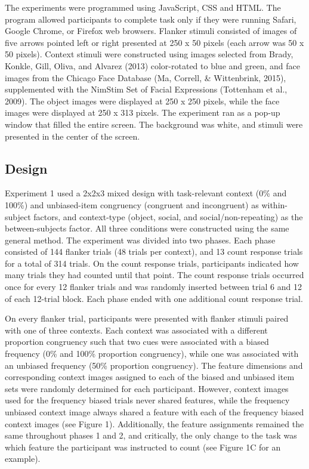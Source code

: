 \documentclass[english,,man,floatsintext]{apa6}
\begin{document}
The experiments were programmed using JavaScript, CSS and HTML. The program allowed participants to complete task only if they were running Safari, Google Chrome, or Firefox web browsers. Flanker stimuli consisted of images of five arrows pointed left or right presented at 250 x 50 pixels (each arrow was 50 x 50 pixels). Context stimuli were constructed using images selected from Brady, Konkle, Gill, Oliva, and Alvarez (2013) color-rotated to blue and green, and face images from the Chicago Face Database (Ma, Correll, \& Wittenbrink, 2015), supplemented with the NimStim Set of Facial Expressions (Tottenham et al., 2009). The object images were displayed at 250 x 250 pixels, while the face images were displayed at 250 x 313 pixels. The experiment ran as a pop-up window that filled the entire screen. The background was white, and stimuli were presented in the center of the screen.

\hypertarget{design}{%
\subsection{Design}\label{design}}

Experiment 1 used a 2x2x3 mixed design with task-relevant context (0\% and 100\%) and unbiased-item congruency (congruent and incongruent) as within-subject factors, and context-type (object, social, and social/non-repeating) as the between-subjects factor.
All three conditions were constructed using the same general method. The experiment was divided into two phases. Each phase consisted of 144 flanker trials (48 trials per context), and 13 count response trials for a total of 314 trials. On the count response trials, participants indicated how many trials they had counted until that point. The count response trials occurred once for every 12 flanker trials and was randomly inserted between trial 6 and 12 of each 12-trial block. Each phase ended with one additional count response trial.

On every flanker trial, participants were presented with flanker stimuli paired with one of three contexts. Each context was associated with a different proportion congruency such that two cues were associated with a biased frequency (0\% and 100\% proportion congruency), while one was associated with an unbiased frequency (50\% proportion congruency). The feature dimensions and corresponding context images assigned to each of the biased and unbiased item sets were randomly determined for each participant. However, context images used for the frequency biased trials never shared features, while the frequency unbiased context image always shared a feature with each of the frequency biased context images (see Figure 1). Additionally, the feature assignments remained the same throughout phases 1 and 2, and critically, the only change to the task was which feature the participant was instructed to count (see Figure 1C for an example).
\end{document}
